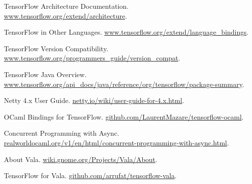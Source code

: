 \documentclass[letterpaper,twocolumn,10pt]{article}
\begin{document}
\begin{thebibliography}{9}
        \raggedright
        TensorFlow Architecture Documentation. \url{www.tensorflow.org/extend/architecture}.

        TensorFlow in Other Languages. \url{www.tensorflow.org/extend/language_bindings}.

        TensorFlow Version Compatibility. \url{www.tensorflow.org/programmers_guide/version_compat}.

        TensorFlow Java Overview. \url{www.tensorflow.org/api_docs/java/reference/org/tensorflow/package-summary}.

        Netty 4.x User Guide. \url{netty.io/wiki/user-guide-for-4.x.html}.

        OCaml Bindings for TensorFlow. \url{github.com/LaurentMazare/tensorflow-ocaml}.

        Concurrent Programming with Async. \url{realworldocaml.org/v1/en/html/concurrent-programming-with-async.html}.

        About Vala. \url{wiki.gnome.org/Projects/Vala/About}.
        
        TensorFlow for Vala. \url{github.com/arrufat/tensorflow-vala}.
\end{thebibliography}
\end{document}

